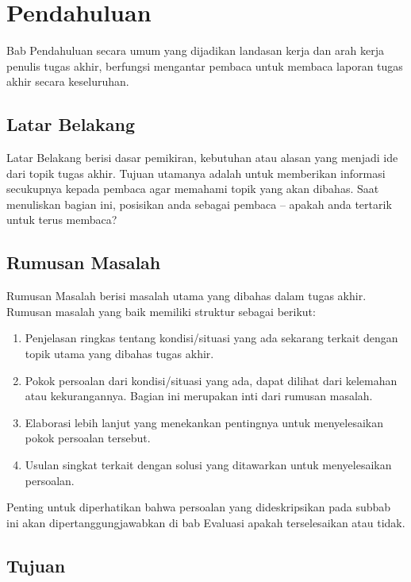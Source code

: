 \chapter{Pendahuluan}

Bab Pendahuluan secara umum yang dijadikan landasan kerja dan arah kerja penulis tugas akhir, berfungsi mengantar pembaca untuk membaca laporan tugas akhir secara keseluruhan.

\section{Latar Belakang}

Latar Belakang berisi dasar pemikiran, kebutuhan atau alasan yang menjadi ide dari topik tugas akhir. Tujuan utamanya adalah untuk memberikan informasi secukupnya kepada pembaca agar memahami topik yang akan dibahas.  Saat menuliskan bagian ini, posisikan anda sebagai pembaca – apakah anda tertarik untuk terus membaca?

\section{Rumusan Masalah}

Rumusan Masalah berisi masalah utama yang dibahas dalam tugas akhir. Rumusan masalah yang baik memiliki struktur sebagai berikut:

\begin{enumerate}
    \item Penjelasan ringkas tentang kondisi/situasi yang ada sekarang terkait dengan topik utama yang dibahas tugas akhir.
    \item Pokok persoalan dari kondisi/situasi yang ada, dapat dilihat dari kelemahan atau kekurangannya. Bagian ini merupakan inti dari rumusan masalah.
    \item Elaborasi lebih lanjut yang menekankan pentingnya untuk menyelesaikan pokok persoalan tersebut.
    \item Usulan singkat terkait dengan solusi yang ditawarkan untuk menyelesaikan persoalan.
\end{enumerate}

Penting untuk diperhatikan bahwa persoalan yang dideskripsikan pada subbab ini akan dipertanggungjawabkan di bab Evaluasi apakah terselesaikan atau tidak.

\section{Tujuan}

